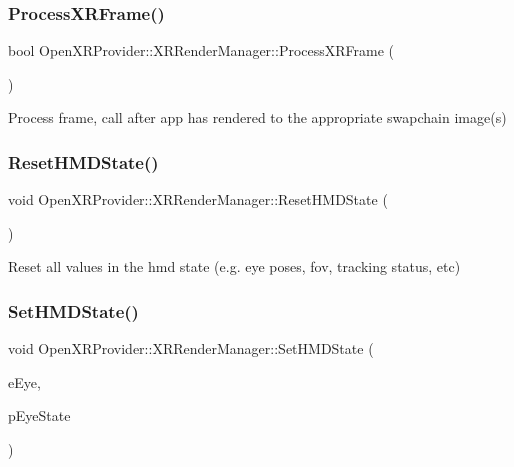 \subsubsection{\texorpdfstring{ProcessXRFrame()}{ProcessXRFrame()}}
{\footnotesize\ttfamily bool Open\+X\+R\+Provider\+::\+X\+R\+Render\+Manager\+::\+Process\+X\+R\+Frame (\begin{DoxyParamCaption}{ }\end{DoxyParamCaption})}



Process frame, call after app has rendered to the appropriate swapchain image(s) 

\mbox{\label{class_open_x_r_provider_1_1_x_r_render_manager_ab3dbed1a6e82b338e948def236adbf7b}} 
\subsubsection{\texorpdfstring{ResetHMDState()}{ResetHMDState()}}
{\footnotesize\ttfamily void Open\+X\+R\+Provider\+::\+X\+R\+Render\+Manager\+::\+Reset\+H\+M\+D\+State (\begin{DoxyParamCaption}{ }\end{DoxyParamCaption})\hspace{0.3cm}{\ttfamily [private]}}



Reset all values in the hmd state (e.\+g. eye poses, fov, tracking status, etc) 

\mbox{\label{class_open_x_r_provider_1_1_x_r_render_manager_ab9e9d2271f8c7e2740dad5e99c92343c}} 
\subsubsection{\texorpdfstring{SetHMDState()}{SetHMDState()}}
{\footnotesize\ttfamily void Open\+X\+R\+Provider\+::\+X\+R\+Render\+Manager\+::\+Set\+H\+M\+D\+State (\begin{DoxyParamCaption}\item[{\mbox{\hyperlink{namespace_open_x_r_provider_a8aa379869e30772896e6c468eb54f155}{E\+X\+R\+Eye}}}]{e\+Eye,  }\item[{\mbox{\hyperlink{struct_open_x_r_provider_1_1_x_r_eye_state}{X\+R\+Eye\+State}} $\ast$}]{p\+Eye\+State }\end{DoxyParamCaption})\hspace{0.3cm}{\ttfamily [private]}}

